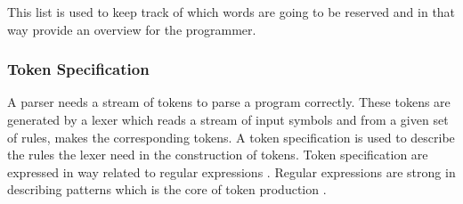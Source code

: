 This list is used to keep track of which words are going to be reserved and in that way provide an overview for the programmer. 

\subsubsection{Token Specification}
A parser needs a stream of tokens to parse a program correctly. These tokens are generated by a lexer which reads a stream of input symbols and from a given set of rules, makes the corresponding tokens. A token specification is used to describe the rules the lexer need in the construction of tokens. Token specification are expressed in way related to regular expressions \citep{sebesta}. Regular expressions are strong in describing patterns which is the core of token production \citep{sipser}.

